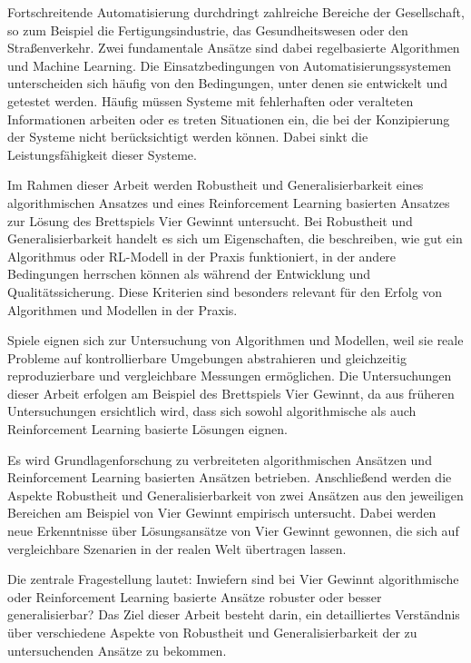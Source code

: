 Fortschreitende Automatisierung durchdringt zahlreiche Bereiche der Gesellschaft, so zum Beispiel die Fertigungsindustrie, das Gesundheitswesen oder den Straßenverkehr. Zwei fundamentale Ansätze sind dabei regelbasierte Algorithmen und Machine Learning. Die Einsatzbedingungen von Automatisierungssystemen unterscheiden sich häufig von den Bedingungen, unter denen sie entwickelt und getestet werden. Häufig müssen Systeme mit fehlerhaften oder veralteten Informationen arbeiten oder es treten Situationen ein, die bei der Konzipierung der Systeme nicht berücksichtigt werden können. Dabei sinkt die Leistungsfähigkeit dieser Systeme.

Im Rahmen dieser Arbeit werden Robustheit und Generalisierbarkeit eines algorithmischen Ansatzes und eines Reinforcement Learning basierten Ansatzes zur Lösung des Brettspiels \glqq Vier Gewinnt\grqq{} untersucht. Bei Robustheit und Generalisierbarkeit handelt es sich um Eigenschaften, die beschreiben, wie gut ein Algorithmus oder RL-Modell in der Praxis funktioniert, in der andere Bedingungen herrschen können als während der Entwicklung und Qualitätssicherung. Diese Kriterien sind besonders relevant für den Erfolg von Algorithmen und Modellen in der Praxis.

Spiele eignen sich zur Untersuchung von Algorithmen und Modellen, weil sie reale Probleme auf kontrollierbare Umgebungen abstrahieren und gleichzeitig reproduzierbare und vergleichbare Messungen ermöglichen. Die Untersuchungen dieser Arbeit erfolgen am Beispiel des Brettspiels \glqq Vier Gewinnt\grqq{}, da aus früheren Untersuchungen ersichtlich wird, dass sich sowohl algorithmische als auch Reinforcement Learning basierte Lösungen eignen.

Es wird Grundlagenforschung zu verbreiteten algorithmischen Ansätzen und Reinforcement Learning basierten Ansätzen betrieben. Anschließend werden die Aspekte Robustheit und Generalisierbarkeit von zwei Ansätzen aus den jeweiligen Bereichen am Beispiel von Vier Gewinnt empirisch untersucht. Dabei werden neue Erkenntnisse über Lösungsansätze von Vier Gewinnt gewonnen, die sich auf vergleichbare Szenarien in der realen Welt übertragen lassen.

Die zentrale Fragestellung lautet: Inwiefern sind bei Vier Gewinnt algorithmische oder Reinforcement Learning basierte Ansätze robuster oder besser generalisierbar? Das Ziel dieser Arbeit besteht darin, ein detailliertes Verständnis über verschiedene Aspekte von Robustheit und Generalisierbarkeit der zu untersuchenden Ansätze zu bekommen.